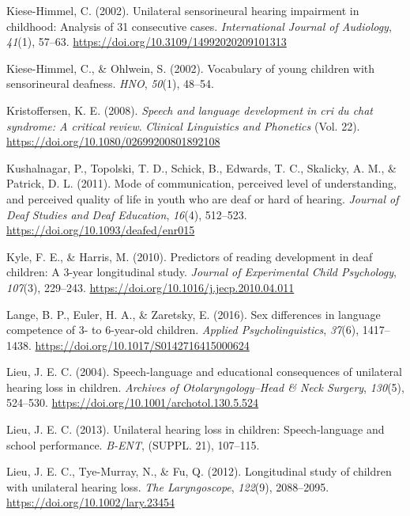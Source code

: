\documentclass[english,man]{apa6}
\begin{document}
\leavevmode\hypertarget{ref-kiese-himmel2002}{}%
Kiese-Himmel, C. (2002). Unilateral sensorineural hearing impairment in childhood: Analysis of 31 consecutive cases. \emph{International Journal of Audiology}, \emph{41}(1), 57--63. \url{https://doi.org/10.3109/14992020209101313}

\leavevmode\hypertarget{ref-kiese-himmel2002a}{}%
Kiese-Himmel, C., \& Ohlwein, S. (2002). Vocabulary of young children with sensorineural deafness. \emph{HNO}, \emph{50}(1), 48--54.

\leavevmode\hypertarget{ref-kristoffersen2008}{}%
Kristoffersen, K. E. (2008). \emph{Speech and language development in cri du chat syndrome: A critical review}. \emph{Clinical Linguistics and Phonetics} (Vol. 22). \url{https://doi.org/10.1080/02699200801892108}

\leavevmode\hypertarget{ref-kushalnagar2011}{}%
Kushalnagar, P., Topolski, T. D., Schick, B., Edwards, T. C., Skalicky, A. M., \& Patrick, D. L. (2011). Mode of communication, perceived level of understanding, and perceived quality of life in youth who are deaf or hard of hearing. \emph{Journal of Deaf Studies and Deaf Education}, \emph{16}(4), 512--523. \url{https://doi.org/10.1093/deafed/enr015}

\leavevmode\hypertarget{ref-kyle2010}{}%
Kyle, F. E., \& Harris, M. (2010). Predictors of reading development in deaf children: A 3-year longitudinal study. \emph{Journal of Experimental Child Psychology}, \emph{107}(3), 229--243. \url{https://doi.org/10.1016/j.jecp.2010.04.011}

\leavevmode\hypertarget{ref-lange2016}{}%
Lange, B. P., Euler, H. A., \& Zaretsky, E. (2016). Sex differences in language competence of 3- to 6-year-old children. \emph{Applied Psycholinguistics}, \emph{37}(6), 1417--1438. \url{https://doi.org/10.1017/S0142716415000624}

\leavevmode\hypertarget{ref-lieu2004}{}%
Lieu, J. E. C. (2004). Speech-language and educational consequences of unilateral hearing loss in children. \emph{Archives of Otolaryngology--Head \& Neck Surgery}, \emph{130}(5), 524--530. \url{https://doi.org/10.1001/archotol.130.5.524}

\leavevmode\hypertarget{ref-lieu2013}{}%
Lieu, J. E. C. (2013). Unilateral hearing loss in children: Speech-language and school performance. \emph{B-ENT}, (SUPPL. 21), 107--115.

\leavevmode\hypertarget{ref-lieu2012}{}%
Lieu, J. E. C., Tye-Murray, N., \& Fu, Q. (2012). Longitudinal study of children with unilateral hearing loss. \emph{The Laryngoscope}, \emph{122}(9), 2088--2095. \url{https://doi.org/10.1002/lary.23454}
\end{document}
